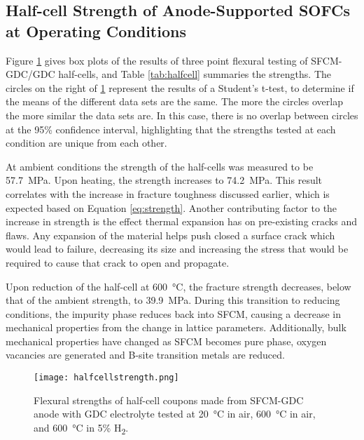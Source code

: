     \subsection{Half-cell Strength of Anode-Supported SOFCs at Operating Conditions}
        Figure \ref{fig:InSituBox} gives box plots of the results of three point flexural testing of SFCM-GDC/GDC half-cells, and Table \ref{tab:halfcell} summaries the strengths.
        The circles on the right of \ref{fig:InSituBox} represent the results of a Student's t-test, to determine if the means of the different data sets are the same.
        The more the circles overlap the more similar the data sets are.
        In this case, there is no overlap between circles at the 95\% confidence interval, highlighting that the strengths tested at each condition are unique from each other.

        At ambient conditions the strength of the half-cells was measured to be \SI{57.7}{\mega\pascal}.
        Upon heating, the strength increases to \SI{74.2}{\mega\pascal}.
        This result correlates with the increase in fracture toughness discussed earlier, which is expected based on Equation \ref{eq:strength}.
        Another contributing factor to the increase in strength is the effect thermal expansion has on pre-existing cracks and flaws.
        Any expansion of the material helps push closed a surface crack which would lead to failure, decreasing its size and increasing the stress that would be required to cause that crack to open and propagate.

        Upon reduction of the half-cell at \SI{600}{\celsius}, the fracture strength decreases, below that of the ambient strength, to \SI{39.9}{\mega\pascal}.
        During this transition to reducing conditions, the impurity phase reduces back into SFCM, causing a decrease in mechanical properties from the change in lattice parameters.
        Additionally, bulk mechanical properties have changed as SFCM becomes pure phase, oxygen vacancies are generated and B-site transition metals are reduced.

        \begin{figure}[p]
          \texttt{[image: halfcellstrength.png]}
          \caption{Flexural strengths of half-cell coupons made from SFCM-GDC anode with GDC electrolyte tested at \SI{20}{\celsius} in air, \SI{600}{\celsius} in air, and \SI{600}{\celsius} in 5\% H\textsubscript{2}.}
          \label{fig:InSituBox}
        \end{figure}

